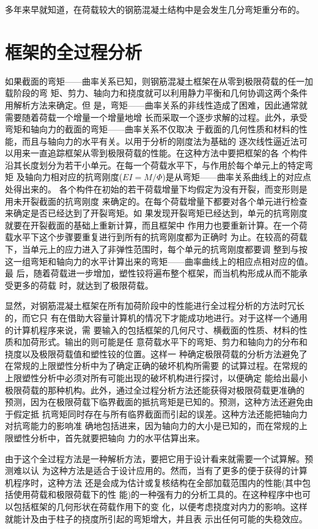 \documentclass[12pt,a4paper]{book}
\begin{document}
多年来早就知道，在荷载较大的钢筋混凝土结构中是会发生几分弯矩重分布的。

\section{框架的全过程分析}

如果截面的弯矩——曲率关系已知，则钢筋混凝土框架在从零到极限荷载的任一加载阶段的弯
矩、剪力、轴向力和挠度就可以利用静力平衡和几何协调这两个条件用解析方法来确定。但
是，弯矩——曲率关系的非线性造成了困难，因此通常就需要随着荷载一个增量一个增量地增
长而采取一个逐步求解的过程。此外，承受弯矩和轴向力的截面的弯矩——曲率关系不仅取决
于截面的几何性质和材料的性能，而且与轴向力的水平有关。以用于分析的刚度法为基础的
逐次线性逼近法可以用来一直追踪框架从零到极限荷载的性能。在这种方法中要把框架的各
个构件沿其长度划分为若干小单元。在每一个荷载水平下，与作用於每个单元上的特定弯矩
及轴向力相对应的抗弯刚度($EI=M/\Phi$)是从弯矩——曲率关系曲线上的对应点处得出来的。
各个构件在初始的若干荷载增量下均假定为没有开裂，而变形则是用未开裂截面的抗弯刚度
来确定的。在每个荷载增量下都要对各个单元进行检查来确定是否已经达到了开裂弯矩。如
果发现开裂弯矩已经达到，单元的抗弯刚度就要在开裂截面的基础上重新计算，而且框架中
作用力也要重新计算。在一个荷载水平下这个步骤要重复进行到所有的抗弯刚度都为正确时
为止。在较高的荷载下，当单元上的应力进入了非弹性范围时，每个单元的抗弯刚度都要调
整到与按这一组弯矩和轴向力的水平计算出来的弯矩——曲率曲线上的相应点相对应的值。最
后，随着荷载进一步增加，塑性铰将遍布整个框架，而当机构形成从而不能承受更多的荷载
时，就达到了极限荷载。

显然，对钢筋混凝土框架在所有加荷阶段中的性能进行全过程分析的方法时冗长的，而它只
有在借助大容量计算机的情况下才能成功地进行。对于这样一个通用的计算机程序来说，需
要输入的包括框架的几何尺寸、横截面的性质、材料的性质和加荷形式。输出的则可能是任
意荷载水平下的弯矩、剪力和轴向力的分布和挠度以及极限荷载值和塑性铰的位置。这样一
种确定极限荷载的分析方法避免了在常规的上限塑性分析中为了确定正确的破坏机构所需要
的试算过程。在常规的上限塑性分析中必须对所有可能出现的破坏机构进行探讨，以便确定
能给出最小极限荷载的那种机构。此外，通过全过程分析方法还能获得对极限荷载更准确的
预测，因为在极限荷载下临界截面的抵抗弯矩是已知的。预测，这种方法还避免由于假定抵
抗弯矩同时存在与所有临界截面而引起的误差。这种方法还能把轴向力对抗弯能力的影响准
确地包括进来，因为轴向力的大小是已知的，而在常规的上限塑性分析中，首先就要把轴向
力的水平估算出来。

由于这个全过程方法是一种解析方法，要把它用于设计看来就需要一个试算解。预测难以认
为这种方法是适合于设计应用的。然而，当有了更多的便于获得的计算机程序时，这种方法
还是会成为估计或复核结构在全部加载范围内的性能(其中包括使用荷载和极限荷载下的性
能)的一种强有力的分析工具的。在这种程序中也可以包括框架的几何形状在荷载作用下的变
化，以便考虑挠度对内力的影响。这样就能计及由于柱子的挠度所引起的弯矩增大，并且表
示出任何可能的失稳效应。
\end{document}
